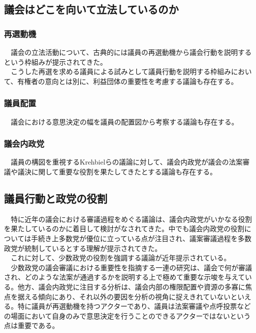 \documentclass{article}
\begin{document}
\subsection{議会はどこを向いて立法しているのか}
\subsubsection{再選動機}
　議会の立法活動について、古典的には議員の再選動機から議会行動を説明するという枠組みが提示されてきた。\citep*{Mayhew1974-jz}\\
　こうした再選を求める議員による試みとして議員行動を説明する枠組みにおいて、有権者の意向とは別に、利益団体の重要性を考慮する議論も存在する。\\

\subsubsection{議員配置}
　議会における意思決定の幅を議員の配置図から考察する議論も存在する。\citep*{Krehbiel2010-ob,Tsebelis2009-hf}
\subsubsection{議会内政党}
　議員の構図を重視するKrehbielらの議論に対して、議会内政党が議会の法案審議や議決に関して重要な役割を果たしてきたとする議論も存在する。\citep*{Cox2005-pn,Cox2007-xq,Rohde1991-da,Aldrich1995-xf}\\
\subsection{議員行動と政党の役割}
　特に近年の議会における審議過程をめぐる議論は、議会内政党がいかなる役割を果たしているのかに着目して検討がなされてきた。中でも議会内政党の役割については手続き上多数党が優位に立っている点が注目され、議案審議過程を多数政党が統制しているとする理解が提示されてきた。\citep*{Cox2005-pn,Cox2007-xq}\\
　これに対して、少数政党の役割を強調する議論が近年提示されている。\citep*{Hughes2018-dj,Hughes2021-cp,Ballard2021-su}\\
　少数政党の議会審議における重要性を指摘する一連の研究は、議会で何が審議され、どのような法案が通過するかを説明する上で極めて重要な示唆を与えている。他方、議会内政党に注目する分析は、議会内部の権限配置や資源の多寡に焦点を据える傾向にあり、それ以外の要因を分析の視角に捉えきれていないといえる。特に議員が再選動機を持つアクターであり、議員は法案審議や点呼投票などの場面において自身のみで意思決定を行うことのできるアクターではないという点は重要である。
\end{document}
